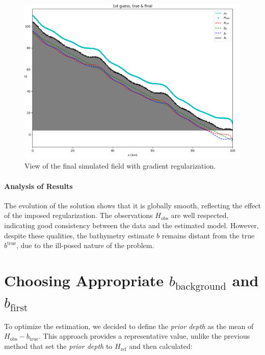\documentclass{article}
\begin{document}
\begin{figure}[H]
    \vspace{0.5cm}
    
    \begin{minipage}[b]{0.7\linewidth}
        \centering
        \includegraphics[width=\linewidth]{Images_Ayoub/With_Regularisation/Gradient/View.png}
        \caption{View of the final simulated field with gradient regularization.}
        \label{fig:grad-view}
    \end{minipage}
\end{figure}

\paragraph{Analysis of Results}
The evolution of the solution shows that it is globally smooth, reflecting the effect of the imposed regularization. The observations \( H_{\text{obs}} \) are well respected, indicating good consistency between the data and the estimated model. However, despite these qualities, the bathymetry estimate \( b \) remains distant from the true \( b^{\text{true}} \), due to the ill-posed nature of the problem.

\section{Choosing Appropriate \( b_{\text{background}} \) and \( b_{\text{first}} \)}

To optimize the estimation, we decided to define the \emph{prior depth} as the mean of \( H_{\text{obs}} - b_{\text{true}} \). This approach provides a representative value, unlike the previous method that set the \emph{prior depth} to \( H_{\text{ref}} \) and then calculated:
\end{document}
